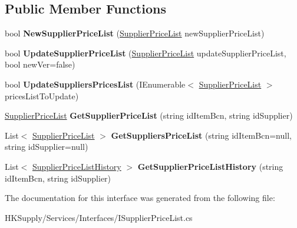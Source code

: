 \subsection*{Public Member Functions}
\begin{DoxyCompactItemize}
\item 
\mbox{\label{interface_h_k_supply_1_1_services_1_1_interfaces_1_1_i_supplier_price_list_a7f6bc8eb46de01f7c89aeaaee9790498}} 
bool {\bfseries New\+Supplier\+Price\+List} (\mbox{\hyperlink{class_h_k_supply_1_1_models_1_1_supplier_price_list}{Supplier\+Price\+List}} new\+Supplier\+Price\+List)
\item 
\mbox{\label{interface_h_k_supply_1_1_services_1_1_interfaces_1_1_i_supplier_price_list_add4ac07cfe7bb3c8f3178e4850d09212}} 
bool {\bfseries Update\+Supplier\+Price\+List} (\mbox{\hyperlink{class_h_k_supply_1_1_models_1_1_supplier_price_list}{Supplier\+Price\+List}} update\+Supplier\+Price\+List, bool new\+Ver=false)
\item 
\mbox{\label{interface_h_k_supply_1_1_services_1_1_interfaces_1_1_i_supplier_price_list_ab769ce0e643dda0b271c71784d5796bb}} 
bool {\bfseries Update\+Suppliers\+Prices\+List} (I\+Enumerable$<$ \mbox{\hyperlink{class_h_k_supply_1_1_models_1_1_supplier_price_list}{Supplier\+Price\+List}} $>$ prices\+List\+To\+Update)
\item 
\mbox{\label{interface_h_k_supply_1_1_services_1_1_interfaces_1_1_i_supplier_price_list_a7de518a8839cd36e629c769c536a574a}} 
\mbox{\hyperlink{class_h_k_supply_1_1_models_1_1_supplier_price_list}{Supplier\+Price\+List}} {\bfseries Get\+Supplier\+Price\+List} (string id\+Item\+Bcn, string id\+Supplier)
\item 
\mbox{\label{interface_h_k_supply_1_1_services_1_1_interfaces_1_1_i_supplier_price_list_a50e62f83d3f2a2f036c74f8ef805b2e0}} 
List$<$ \mbox{\hyperlink{class_h_k_supply_1_1_models_1_1_supplier_price_list}{Supplier\+Price\+List}} $>$ {\bfseries Get\+Suppliers\+Price\+List} (string id\+Item\+Bcn=null, string id\+Supplier=null)
\item 
\mbox{\label{interface_h_k_supply_1_1_services_1_1_interfaces_1_1_i_supplier_price_list_acd162b1599a5866e185eb06b827efc5f}} 
List$<$ \mbox{\hyperlink{class_h_k_supply_1_1_models_1_1_supplier_price_list_history}{Supplier\+Price\+List\+History}} $>$ {\bfseries Get\+Supplier\+Price\+List\+History} (string id\+Item\+Bcn, string id\+Supplier)
\end{DoxyCompactItemize}


The documentation for this interface was generated from the following file\+:\begin{DoxyCompactItemize}
\item 
H\+K\+Supply/\+Services/\+Interfaces/I\+Supplier\+Price\+List.\+cs\end{DoxyCompactItemize}
